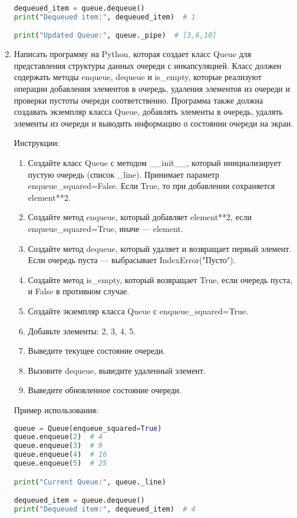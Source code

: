 \begin{enumerate}
\begin{lstlisting}[language=Python]
dequeued_item = queue.dequeue()
print("Dequeued item:", dequeued_item)  # 1

print("Updated Queue:", queue._pipe)  # [3,6,10]
\end{lstlisting}

\item Написать программу на Python, которая создает класс Queue для представления структуры данных очереди с инкапсуляцией. Класс должен содержать методы enqueue, dequeue и is\_empty, которые реализуют операции добавления элементов в очередь, удаления элементов из очереди и проверки пустоты очереди соответственно. Программа также должна создавать экземпляр класса Queue, добавлять элементы в очередь, удалять элементы из очереди и выводить информацию о состоянии очереди на экран.

Инструкции:
\begin{enumerate}
    \item Создайте класс Queue с методом \_\_init\_\_, который инициализирует пустую очередь (список \_line). Принимает параметр enqueue\_squared=False. Если True, то при добавлении сохраняется element**2.
    \item Создайте метод enqueue, который добавляет element**2, если enqueue\_squared=True, иначе — element.
    \item Создайте метод dequeue, который удаляет и возвращает первый элемент. Если очередь пуста — выбрасывает IndexError("Пусто").
    \item Создайте метод is\_empty, который возвращает True, если очередь пуста, и False в противном случае.
    \item Создайте экземпляр класса Queue с enqueue\_squared=True.
    \item Добавьте элементы: 2, 3, 4, 5.
    \item Выведите текущее состояние очереди.
    \item Вызовите dequeue, выведите удаленный элемент.
    \item Выведите обновленное состояние очереди.
\end{enumerate}

Пример использования:
\begin{lstlisting}[language=Python]
queue = Queue(enqueue_squared=True)
queue.enqueue(2)  # 4
queue.enqueue(3)  # 9
queue.enqueue(4)  # 16
queue.enqueue(5)  # 25

print("Current Queue:", queue._line)

dequeued_item = queue.dequeue()
print("Dequeued item:", dequeued_item)  # 4


\end{lstlisting}
\end{enumerate}
